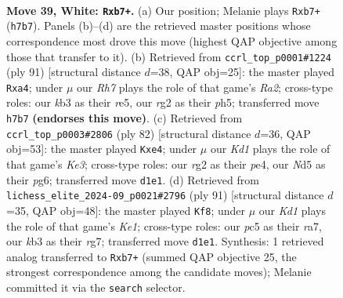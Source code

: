 \documentclass[11pt]{article}
\begin{document}
\clearpage

\begin{figure}[p]\centering
\begin{subfigure}{0.46\textwidth}\centering
\resizebox{\linewidth}{!}{%
\newchessgame
\chessboard[
  setfen={8/pp5R/8/2pN1p1P/4p3/1k6/1P4rr/R2K4 w - - 2 39},
  showmover=false,
  pgfstyle=straightmove, color=movearrow, markmove={h7-b7}
]}
\caption{}
\end{subfigure}\hfill
\begin{subfigure}{0.46\textwidth}\centering
\resizebox{\linewidth}{!}{%
\newchessgame
\chessboard[
  setfen={5k2/r5p1/8/3pR1RP/P7/2P2r2/3K4/8 b - - 0 46},
  showmover=false,
  pgfstyle=straightmove, color=movearrow, markmove={a7-a4}
]}
\caption{}
\end{subfigure}
\\[4pt]
\begin{subfigure}{0.46\textwidth}\centering
\resizebox{\linewidth}{!}{%
\newchessgame
\chessboard[
  setfen={3r4/1R1Pr2p/4k1p1/1p6/4p1PP/4K3/3R4/8 w - - 5 42},
  showmover=false,
  pgfstyle=straightmove, color=movearrow, markmove={e3-e4}
]}
\caption{}
\end{subfigure}\hfill
\begin{subfigure}{0.46\textwidth}\centering
\resizebox{\linewidth}{!}{%
\newchessgame
\chessboard[
  setfen={4k3/R5R1/2Kp2pp/2p5/6PP/3r1P2/4r3/8 b - - 20 46},
  showmover=false,
  pgfstyle=straightmove, color=movearrow, markmove={e8-f8}
]}
\caption{}
\end{subfigure}
\caption{\textbf{Move 39, White: \texttt{Rxb7+}.} (a) Our position; Melanie plays \texttt{Rxb7+} (\texttt{h7b7}). Panels (b)--(d) are the retrieved master positions whose correspondence most drove this move (highest QAP objective among those that transfer to it). (b) Retrieved from \texttt{ccrl\_top\_p0001\#1224} (ply 91) [structural distance $d$=38, QAP obj=25]: the master played \texttt{Rxa4}; under $\mu$ our \emph{Rh7} plays the role of that game's \emph{Ra2}; cross-type roles: our \emph{k}b3 as their \emph{r}e5, our \emph{r}g2 as their \emph{p}h5; transferred move \texttt{h7b7} \textbf{(endorses this move)}. (c) Retrieved from \texttt{ccrl\_top\_p0003\#2806} (ply 82) [structural distance $d$=36, QAP obj=53]: the master played \texttt{Kxe4}; under $\mu$ our \emph{Kd1} plays the role of that game's \emph{Ke3}; cross-type roles: our \emph{r}g2 as their \emph{p}e4, our \emph{N}d5 as their \emph{p}g6; transferred move \texttt{d1e1}. (d) Retrieved from \texttt{lichess\_elite\_2024-09\_p0021\#2796} (ply 91) [structural distance $d$=35, QAP obj=48]: the master played \texttt{Kf8}; under $\mu$ our \emph{Kd1} plays the role of that game's \emph{Ke1}; cross-type roles: our \emph{p}c5 as their \emph{r}a7, our \emph{k}b3 as their \emph{r}g7; transferred move \texttt{d1e1}. Synthesis: 1 retrieved analog transferred to \texttt{Rxb7+} (summed QAP objective 25, the strongest correspondence among the candidate moves); Melanie committed it via the \texttt{search} selector.}
\label{fig:thought-m76}
\end{figure}
\end{document}
